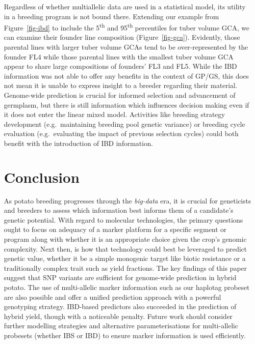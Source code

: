Regardless of whether multiallelic data are used in a statistical model,
its utility in a breeding program is not bound there. Extending our example from Figure~\ref{fig-ibd} to include the 5\textsuperscript{th} and 95\textsuperscript{th} percentiles for tuber volume GCA, we can examine their founder line composition (Figure~\ref{fig-gca}).
Evidently, those parental lines with larger tuber volume GCAs tend to
be over-represented by the founder FL4 while those parental lines with
the smallest tuber volume GCA appear to share large compositions of
founders' FL3 and FL5. While the IBD information was not able to
offer any benefits in the context of GP/GS, this does not mean it is
unable to express insight to a breeder regarding their material.
Genome-wide prediction is crucial for informed selection and advancement
of germplasm, but there is still information which influences decision
making even if it does not enter the linear mixed model. Activities like breeding strategy development (e.g.~maintaining breeding pool genetic variance) or breeding cycle evaluation (e.g.~evaluating the impact of previous selection cycles) could both benefit with the introduction of IBD information.

\hypertarget{conclusion}{%
\section{Conclusion}\label{conclusion}}

As potato breeding progresses through the \emph{big-data} era, it is
crucial for geneticists and breeders to assess which information best
informs them of a candidate's genetic potential. With regard to
molecular technologies, the primary questions ought to focus on adequacy
of a marker platform for a specific segment or program along with
whether it is an appropriate choice given the crop's genomic complexity.
Next then, is how that technology could best be leveraged to predict
genetic value, whether it be a simple monogenic target like biotic
resistance or a traditionally complex trait such as yield fractions. The
key findings of this paper suggest that SNP variants are sufficient for
genome-wide prediction in hybrid potato. The use of multi-allelic marker
information such as our haplotag probeset are also possible and offer a
unified prediction approach with a powerful genotyping strategy.
IBD-based predictors also succeeded in the prediction of hybrid yield,
though with a noticeable penalty. Future work should consider further
modelling strategies and alternative parameterisations for multi-allelic
probesets (whether IBS or IBD) to ensure marker information is used
efficiently.




